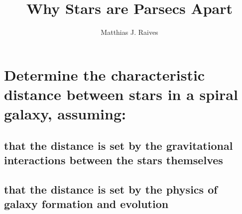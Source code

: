 \documentclass{article}
\title{Why Stars are Parsecs Apart}
\author{Matthias J. Raives}
\begin{document}
  
  \maketitle{}
  
  \section{Determine the characteristic distance between stars in a spiral galaxy, assuming:}
  
  \subsection{that the distance is set by the gravitational interactions between the stars themselves}
  
  \subsection{that the distance is set by the physics of galaxy formation and evolution}
  
\end{document}
